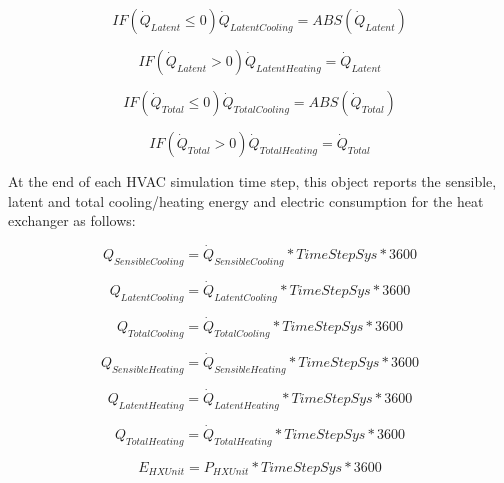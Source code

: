 \begin{equation}
IF \left( {{{\dot{Q}_{Latent}}} \leq 0} \right) {\dot{Q}_{LatentCooling}} = ABS\left( {\dot{Q}_{Latent}} \right)
\end{equation}

\begin{equation}
IF \left( {{\dot{Q}_{Latent}} > 0} \right){\dot{Q}_{LatentHeating}} = {\dot{Q}_{Latent}}
\end{equation}

\begin{equation}
IF \left( {{{\dot{Q}_{Total}}} \leq 0} \right) {\dot{Q}_{TotalCooling}} = ABS\left( {\dot{Q}_{Total}} \right)
\end{equation}

\begin{equation}
IF \left( {{\dot{Q}_{Total}} > 0} \right){\dot{Q}_{TotalHeating}} = {\dot{Q}_{Total}}
\end{equation}

At the end of each HVAC simulation time step, this object reports the sensible, latent and total cooling/heating energy and electric consumption for the heat exchanger as follows:

\begin{equation}
{Q_{SensibleCooling}} = {\dot Q_{SensibleCooling}}*TimeStepSys*3600
\end{equation}

\begin{equation}
{Q_{LatentCooling}} = {\dot Q_{LatentCooling}}*TimeStepSys*3600
\end{equation}

\begin{equation}
{Q_{TotalCooling}} = {\dot Q_{TotalCooling}}*TimeStepSys*3600
\end{equation}

\begin{equation}
{Q_{SensibleHeating}} = {\dot Q_{SensibleHeating}}*TimeStepSys*3600
\end{equation}

\begin{equation}
{Q_{LatentHeating}} = {\dot Q_{LatentHeating}}*TimeStepSys*3600
\end{equation}

\begin{equation}
{Q_{TotalHeating}} = {\dot Q_{TotalHeating}}*TimeStepSys*3600
\end{equation}

\begin{equation}
{E_{HXUnit}} = {P_{HXUnit}}*TimeStepSys*3600
\end{equation}

